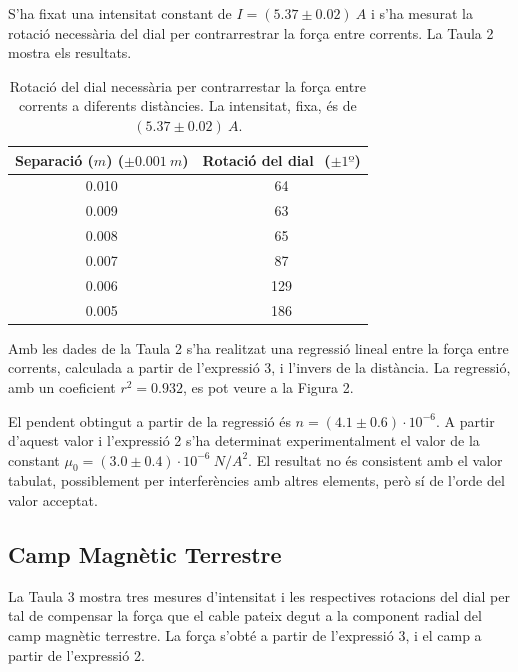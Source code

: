 S'ha fixat una intensitat constant de $I=(5.37\pm0.02)\ \si{A}$ i s'ha mesurat la rotació necessària del dial per contrarrestrar la força entre corrents. La Taula 2 mostra els resultats.

\begin{table}
	\centering
	\caption{Rotació del dial necessària per contrarrestar la força entre corrents a diferents distàncies. La intensitat, fixa, és de $(5.37\pm0.02)\ \si{A}$.}
	\vspace{0.5cm}
	\begin{tabular}{|c|c|}
		\hline
		\textbf{Separació ($\si{m}$) ($\pm 0.001\ \si{m}$)}&\textbf{Rotació del dial} $\si{}$ ($\pm 1º$) \\ \hline
		0.010 & 64  \\ \hline
		0.009 & 63  \\ \hline 
		0.008 & 65 \\ \hline 
		0.007 & 87  \\ \hline 
		0.006 & 129  \\ \hline  
		0.005 & 186  \\ \hline  
	\end{tabular}
\end{table}
Amb les dades de la Taula 2 s'ha realitzat una regressió lineal entre la força entre corrents, calculada a partir de l'expressió 3, i l'invers de la distància. La regressió, amb un coeficient $r^2=0.932$, es pot veure a la Figura 2.

El pendent obtingut a partir de la regressió és $n=(4.1\pm0.6)\cdot10^{-6}$. A partir d'aquest valor i l'expressió 2 s'ha determinat experimentalment el valor de la constant $\mu_0=(3.0\pm0.4)\cdot10^{-6}\ \si{N/A^2}$. El resultat no és consistent amb el valor tabulat, possiblement per interferències amb altres elements, però sí de l'orde del valor acceptat.

\subsection{Camp Magnètic Terrestre}
La Taula 3 mostra tres mesures d'intensitat i les respectives rotacions del dial per tal de compensar la força que el cable pateix degut a la component radial del camp magnètic terrestre. La força s'obté a partir de l'expressió 3, i el camp a partir de l'expressió 2.

